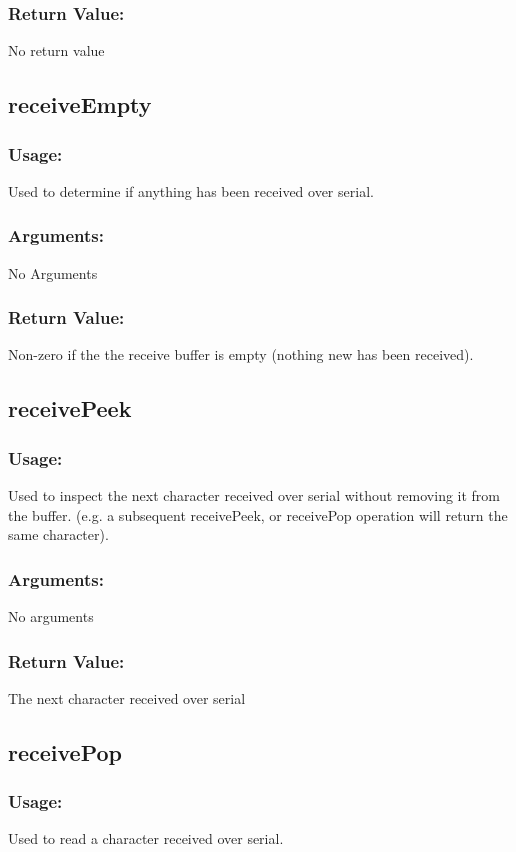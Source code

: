 \documentclass[]{report}
\begin{document}
\subsubsection{Return Value:}
No return value

\subsection{receiveEmpty}
\subsubsection{Usage:}
Used to determine if anything has been received over serial.

\subsubsection{Arguments:}
No Arguments

\subsubsection{Return Value:}
Non-zero if the the receive buffer is empty (nothing new has been received).

\subsection{receivePeek}
\subsubsection{Usage:}
Used to inspect the next character received over serial without removing it from the buffer. (e.g. a subsequent receivePeek, or receivePop operation will return the same character).

\subsubsection{Arguments:}
No arguments

\subsubsection{Return Value:}
The next character received over serial

\subsection{receivePop}
\subsubsection{Usage:}
Used to read a character received over serial.
\end{document}
